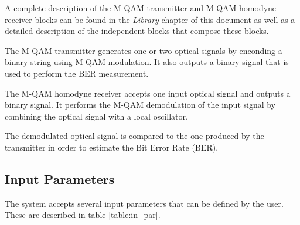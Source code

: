 A complete description of the M-QAM transmitter and M-QAM homodyne receiver blocks can be found in the \textit{Library} chapter of this document as well as a detailed description of the independent blocks that compose these blocks.

The M-QAM transmitter generates one or two optical signals by enconding a binary string using M-QAM modulation. It also outputs a binary signal that is used to perform the BER measurement.

The M-QAM homodyne receiver accepts one input optical signal and outputs
a binary signal. It performs the M-QAM demodulation of the input signal by combining the optical signal with a local oscillator.

The demodulated optical signal is compared to the one produced by the transmitter in order to estimate the Bit Error Rate (BER).

\subsection*{Input Parameters}

The system accepts several input parameters that can be defined by the user. These are described in table \ref{table:in_par}.

